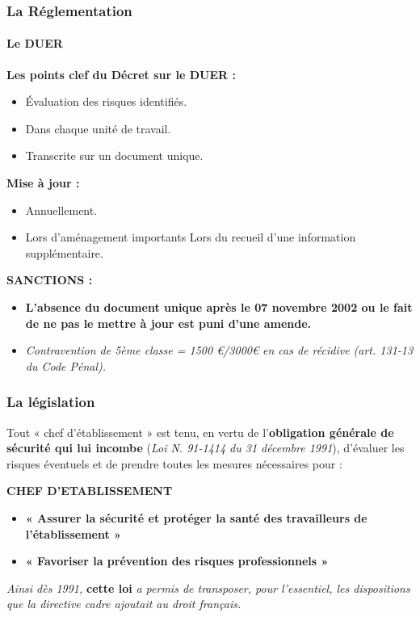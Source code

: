 \documentclass{beamer}
\begin{document}
\begin{frame}
\frametitle{La Réglementation}
\framesubtitle{Le DUER}

\textbf{Les points clef du Décret sur le DUER :}

\begin{itemize}

	\item Évaluation des risques identifiés.
	
	\item Dans chaque unité de travail.
	
	\item Transcrite sur un document unique.
\end{itemize}	
\textbf{Mise à jour :}
\begin{itemize}
	\item Annuellement.
	\item Lors d’aménagement importants
Lors du recueil d’une information supplémentaire.
\end{itemize}
	
\textbf{SANCTIONS :}
\begin{itemize}
\item \textbf{L’absence du document unique après le 07 novembre 2002 ou le fait de ne pas le mettre à jour est puni d’une amende.}

\item \textit{Contravention de 5ème classe = 1500 \euro{}/3000\euro{} en cas de récidive (art. 131-13 du Code Pénal).}
\end{itemize}
\end{frame}

\begin{frame}
\frametitle{La législation}

Tout « chef d’établissement » est tenu, 
en vertu de l’\textbf{obligation générale de sécurité qui lui incombe} (\textit{Loi N. 91-1414 du 31 décembre 1991}), d’évaluer les risques éventuels et de prendre toutes les mesures nécessaires pour :

\textbf{CHEF D’ETABLISSEMENT}

\begin{itemize}
	\item \textbf{« Assurer la sécurité et protéger la santé des travailleurs de l’établissement »}

	\item \textbf{« Favoriser la prévention des risques professionnels »}
\end{itemize}

\textit{Ainsi dès 1991,} \textbf{cette loi}\textit{ a permis de transposer, pour l'essentiel, les dispositions que la directive cadre ajoutait au droit français.}

\end{frame}
\end{document}

